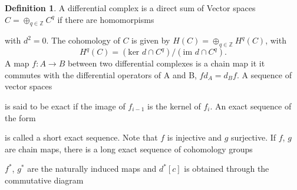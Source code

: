 \documentclass[twocolumn]{article}
\theoremstyle{definition}
\newtheorem{definition}{Definition}[section]
\theoremstyle{remark}
\begin{document}
\begin{definition}
    A differential complex is a direct sum of Vector spaces $C = \oplus_{q\in\mathbb{Z}} C^q$ if there are homomorpisms
    \begin{center}
    \end{center}
    with $d^2 = 0$. The cohomology of $C$ is given by $H(C) = \oplus_{q\in\mathbb{Z}} H^q(C)$, with
    \begin{equation}
        H^q(C) = (\textrm{ker } d \cap C^q)/(\textrm{im } d \cap C^q).
    \end{equation}
    A map $f: A \rightarrow B$ between two differential complexes is a chain map it it commutes with the differential operators of A and B, $fd_A=d_Bf$.
    A sequence of vector spaces
    \begin{center}
    \end{center}
    is said to be exact if the image of $f_{i-1}$ is the kernel of $f_{i}$.
    An exact sequence of the form
    \begin{center}
    \end{center}
    is called a short exact sequence. Note that $f$ is injective and $g$ surjective.
    If $f$, $g$ are chain maps, there is a long exact sequence of cohomology groups
    \begin{center}
    \end{center}
    $f^*$, $g^*$ are the naturally induced maps and $d^*[c]$ is obtained through the commutative diagram
    \begin{center}

\end{center}
\end{definition}
\end{document}
